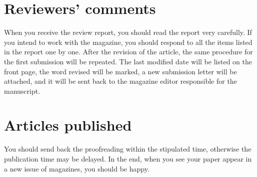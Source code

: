 \section{Reviewers' comments}
When you receive the review report, you should read the report very carefully. If you intend to work with the magazine, you should respond to all the  items listed in the report one by one. After the revision of the article, the same procedure for the first submission will be repeated. The last modified date will be listed on the front page, the word revised will be marked, a new submission letter will be attached, and it will be sent back to the magazine editor  responsible for the manuscript.


\section{Articles published}
You should send back the proofreading within the stipulated time, otherwise the publication time may be delayed. In the end, when you see your paper appear in a new issue of magazines, you should be happy.
